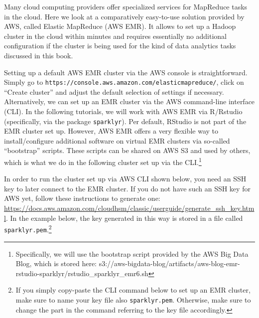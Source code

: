 \documentclass[
  12pt,
]{style/krantz}
\begin{document}
Many cloud computing providers offer specialized services for MapReduce tasks in the cloud. Here we look at a comparatively easy-to-use solution provided by AWS, called Elastic MapReduce (AWS EMR). It allows to set up a Hadoop cluster in the cloud within minutes and requires essentially no additional configuration if the cluster is being used for the kind of data analytics tasks discussed in this book.

Setting up a default AWS EMR cluster via the AWS console is straightforward. Simply go to \texttt{https://console.aws.amazon.com/elasticmapreduce/}, click on ``Create cluster'' and adjust the default selection of settings if necessary. Alternatively, we can set up an EMR cluster via the AWS command-line interface (CLI). In the following tutorials, we will work with AWS EMR via R/Rstudio (specifically, via the package \texttt{sparklyr}). Per default, RStudio is not part of the EMR cluster set up. However, AWS EMR offers a very flexible way to install/configure additional software on virtual EMR clusters via so-called ``bootstrap'' scripts. These scripts can be shared on AWS S3 and used by others, which is what we do in the following cluster set up via the CLI.\footnote{Specifically, we will use the bootstrap script provided by the AWS Big Data Blog, which is stored here: s3://aws-bigdata-blog/artifacts/aws-blog-emr-rstudio-sparklyr/rstudio\_sparklyr\_emr6.sh}

In order to run the cluster set up via AWS CLI shown below, you need an SSH key to later connect to the EMR cluster. If you do not have such an SSH key for AWS yet, follow these instructions to generate one: \url{https://docs.aws.amazon.com/cloudhsm/classic/userguide/generate_ssh_key.html}. In the example below, the key generated in this way is stored in a file called \texttt{sparklyr.pem}.\footnote{If you simply copy-paste the CLI command below to set up an EMR cluster, make sure to name your key file also \texttt{sparklyr.pem}. Otherwise, make sure to change the part in the command referring to the key file accordingly.}
\end{document}

